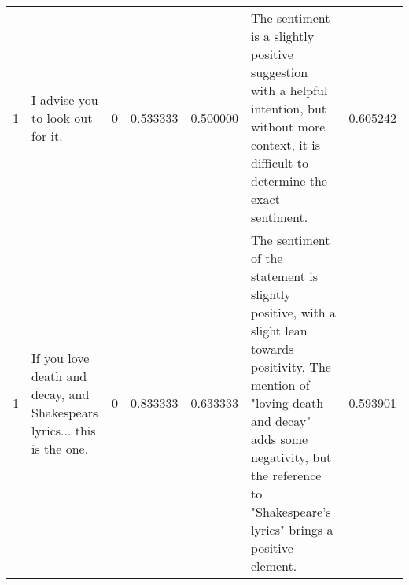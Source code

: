 \begin{tabular}{rlrrrlr}
1 & I advise you to look out for it. & 0 & 0.533333 & 0.500000 & The sentiment is a slightly positive suggestion with a helpful intention, but without more context, it is difficult to determine the exact sentiment. & 0.605242 \\
1 & If you love death and decay, and Shakespears lyrics... this is the one. & 0 & 0.833333 & 0.633333 & The sentiment of the statement is slightly positive, with a slight lean towards positivity. The mention of "loving death and decay" adds some negativity, but the reference to "Shakespeare's lyrics" brings a positive element. & 0.593901 \\
\bottomrule
\end{tabular}
